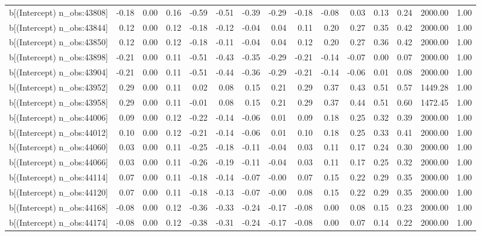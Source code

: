 \begin{table}[ht]
\begin{tabular}{rrrrrrrrrrrrrrr}
  b[(Intercept) n\_obs:43808] & -0.18 & 0.00 & 0.16 & -0.59 & -0.51 & -0.39 & -0.29 & -0.18 & -0.08 & 0.03 & 0.13 & 0.24 & 2000.00 & 1.00 \\ 
  b[(Intercept) n\_obs:43844] & 0.12 & 0.00 & 0.12 & -0.18 & -0.12 & -0.04 & 0.04 & 0.11 & 0.20 & 0.27 & 0.35 & 0.42 & 2000.00 & 1.00 \\ 
  b[(Intercept) n\_obs:43850] & 0.12 & 0.00 & 0.12 & -0.18 & -0.11 & -0.04 & 0.04 & 0.12 & 0.20 & 0.27 & 0.36 & 0.42 & 2000.00 & 1.00 \\ 
  b[(Intercept) n\_obs:43898] & -0.21 & 0.00 & 0.11 & -0.51 & -0.43 & -0.35 & -0.29 & -0.21 & -0.14 & -0.07 & 0.00 & 0.07 & 2000.00 & 1.00 \\ 
  b[(Intercept) n\_obs:43904] & -0.21 & 0.00 & 0.11 & -0.51 & -0.44 & -0.36 & -0.29 & -0.21 & -0.14 & -0.06 & 0.01 & 0.08 & 2000.00 & 1.00 \\ 
  b[(Intercept) n\_obs:43952] & 0.29 & 0.00 & 0.11 & 0.02 & 0.08 & 0.15 & 0.21 & 0.29 & 0.37 & 0.43 & 0.51 & 0.57 & 1449.28 & 1.00 \\ 
  b[(Intercept) n\_obs:43958] & 0.29 & 0.00 & 0.11 & -0.01 & 0.08 & 0.15 & 0.21 & 0.29 & 0.37 & 0.44 & 0.51 & 0.60 & 1472.45 & 1.00 \\ 
  b[(Intercept) n\_obs:44006] & 0.09 & 0.00 & 0.12 & -0.22 & -0.14 & -0.06 & 0.01 & 0.09 & 0.18 & 0.25 & 0.32 & 0.39 & 2000.00 & 1.00 \\ 
  b[(Intercept) n\_obs:44012] & 0.10 & 0.00 & 0.12 & -0.21 & -0.14 & -0.06 & 0.01 & 0.10 & 0.18 & 0.25 & 0.33 & 0.41 & 2000.00 & 1.00 \\ 
  b[(Intercept) n\_obs:44060] & 0.03 & 0.00 & 0.11 & -0.25 & -0.18 & -0.11 & -0.04 & 0.03 & 0.11 & 0.17 & 0.24 & 0.30 & 2000.00 & 1.00 \\ 
  b[(Intercept) n\_obs:44066] & 0.03 & 0.00 & 0.11 & -0.26 & -0.19 & -0.11 & -0.04 & 0.03 & 0.11 & 0.17 & 0.25 & 0.32 & 2000.00 & 1.00 \\ 
  b[(Intercept) n\_obs:44114] & 0.07 & 0.00 & 0.11 & -0.18 & -0.14 & -0.07 & -0.00 & 0.07 & 0.15 & 0.22 & 0.29 & 0.35 & 2000.00 & 1.00 \\ 
  b[(Intercept) n\_obs:44120] & 0.07 & 0.00 & 0.11 & -0.18 & -0.13 & -0.07 & -0.00 & 0.08 & 0.15 & 0.22 & 0.29 & 0.35 & 2000.00 & 1.00 \\ 
  b[(Intercept) n\_obs:44168] & -0.08 & 0.00 & 0.12 & -0.36 & -0.33 & -0.24 & -0.17 & -0.08 & 0.00 & 0.08 & 0.15 & 0.23 & 2000.00 & 1.00 \\ 
  b[(Intercept) n\_obs:44174] & -0.08 & 0.00 & 0.12 & -0.38 & -0.31 & -0.24 & -0.17 & -0.08 & 0.00 & 0.07 & 0.14 & 0.22 & 2000.00 & 1.00 \\ 

\end{tabular}
\end{table}
